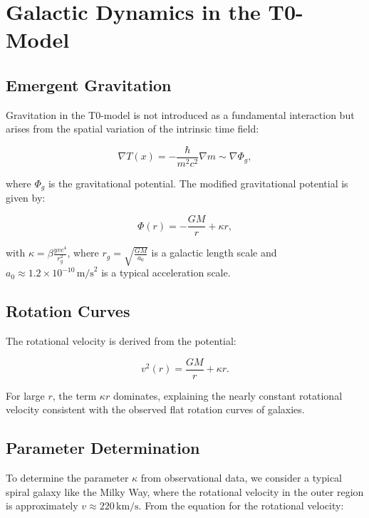 \documentclass[a4paper,12pt]{article}
\newcommand{\Tfield}{T(x)}
\begin{document}
	\section{Galactic Dynamics in the T0-Model}
	
	\subsection{Emergent Gravitation}
	
	Gravitation in the T0-model is not introduced as a fundamental interaction but arises from the spatial variation of the intrinsic time field:
	
	\begin{equation}
		\nabla \Tfield = -\frac{\hbar}{m^2 c^2} \nabla m \sim \nabla \Phi_g,
	\end{equation}
	
	where \( \Phi_g \) is the gravitational potential. The modified gravitational potential is given by:
	
	\begin{equation}
		\Phi(r) = -\frac{G M}{r} + \kappa r,
	\end{equation}
	
	with \( \kappa = \beta \frac{y v c^4}{r_g^2} \), where \( r_g = \sqrt{\frac{G M}{a_0}} \) is a galactic length scale and \( a_0 \approx 1.2 \times 10^{-10} \, \text{m/s}^2 \) is a typical acceleration scale.
	
	\subsection{Rotation Curves}
	
	The rotational velocity is derived from the potential:
	
	\begin{equation}
		v^2(r) = \frac{G M}{r} + \kappa r.
	\end{equation}
	
	For large \( r \), the term \( \kappa r \) dominates, explaining the nearly constant rotational velocity consistent with the observed flat rotation curves of galaxies.
	
	\subsection{Parameter Determination}
	
	To determine the parameter \( \kappa \) from observational data, we consider a typical spiral galaxy like the Milky Way, where the rotational velocity in the outer region is approximately \( v \approx 220 \, \text{km/s} \). From the equation for the rotational velocity:
	
\end{document}
